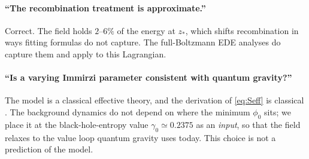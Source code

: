 \documentclass[11pt]{article}
\begin{document}
\paragraph{``The recombination treatment is approximate.''} Correct. The field holds
$2$--$6\%$ of the energy at $z_*$, which shifts recombination in ways fitting formulas
do not capture. The full-Boltzmann EDE analyses \cite{poulin2025} do capture them and
apply to this Lagrangian.

\paragraph{``Is a varying Immirzi parameter consistent with quantum gravity?''} The
model is a classical effective theory, and the derivation of \eqref{eq:Seff} is classical
\cite{taveras2008}. The background dynamics do not depend on where the minimum $\phi_0$
sits; we place it at the black-hole-entropy value $\gamma_0\simeq0.2375$
\cite{domagala2004,meissner2004} as an \emph{input}, so that the field relaxes to the value
loop quantum gravity uses today. This choice is not a prediction of the model.

\end{document}
